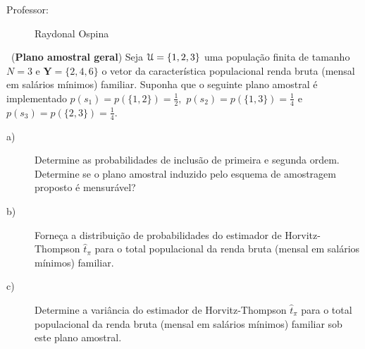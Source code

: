 \documentclass[a4paper,12pt,oneside,twocolumn]{Config/milktest}
\begin{document}
\beb
{\small
\begin{description}
\item[Professor:] Raydonal Ospina


\end{description}
}
\eeb

\balance



\medskip 
\question~({\bf Plano amostral geral})    Seja 
${\cal U}=\{1,2,3\}$ uma população finita de tamanho $N=3$ e $\mathbf{Y} =\{2,4,6\}$  o vetor da característica populacional renda bruta (mensal em salários mínimos) familiar.  Suponha que o seguinte plano amostral é implementado 
$p(s_1)=p(\{1,2\})=\frac{1}{2},$ $p(s_2)=p(\{1,3\})=\frac{1}{4}$ e
$p(s_3)=p(\{2,3\})=\frac{1}{4}.$
\begin{description}
\item[a)] Determine as probabilidades de inclusão de primeira e  segunda ordem. Determine se o plano amostral induzido pelo esquema de amostragem proposto é mensurável? 
\item[b)] Forneça a distribuição de probabilidades do estimador de Horvitz-Thompson $\hat{t}_\pi$ para o total populacional da renda bruta (mensal em salários mínimos) familiar.
\item[c)] Determine a variância do estimador de Horvitz-Thompson $\hat{t}_\pi$ para o total populacional da renda bruta (mensal em salários mínimos) familiar sob este plano amostral.
\end{description}
\end{document}

